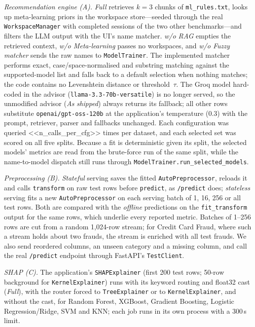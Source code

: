 \emph{Recommendation engine (A).} \emph{Full} retrieves $k{=}3$ chunks of \texttt{ml\_rules.txt}, looks up meta-learning priors in the workspace store---seeded through the real \texttt{WorkspaceManager} with completed sessions of the two other benchmarks---and filters the LLM output with the UI's name matcher. \emph{w/o RAG} empties the retrieved context, \emph{w/o Meta-learning} passes no workspaces, and \emph{w/o Fuzzy matcher} sends the raw names to \texttt{ModelTrainer}. The implemented matcher performs exact, case/space-normalised and substring matching against the supported-model list and falls back to a default selection when nothing matches; the code contains no Levenshtein distance or threshold~$\tau$. The Groq model hard-coded in the advisor (\texttt{llama-3.3-\allowbreak 70b-versatile}) is no longer served, so the unmodified advisor (\emph{As shipped}) always returns its fallback; all other rows substitute \texttt{openai/\allowbreak gpt-oss-120b} at the application's temperature (0.3) with the prompt, retriever, parser and fallbacks unchanged. Each configuration was queried <<n_calls_per_cfg>> times per dataset, and each selected set was scored on all five splits. Because a fit is deterministic given its split, the selected models' metrics are read from the brute-force run of the same split, while the name-to-model dispatch still runs through \texttt{ModelTrainer.\allowbreak run\_selected\_models}.

\emph{Preprocessing (B).} \emph{Stateful} serving saves the fitted \texttt{AutoPreprocessor}, reloads it and calls \texttt{transform} on raw test rows before \texttt{predict}, as \texttt{/predict} does; \emph{stateless} serving fits a new \texttt{AutoPreprocessor} on each serving batch of 1, 16, 256 or all test rows. Both are compared with the \emph{offline} predictions on the \texttt{fit\_transform} output for the same rows, which underlie every reported metric. Batches of 1--256 rows are cut from a random 1{,}024-row stream; for Credit Card Fraud, where such a stream holds about two frauds, the stream is enriched with all test frauds. We also send reordered columns, an unseen category and a missing column, and call the real \texttt{/predict} endpoint through FastAPI's \texttt{TestClient}.

\emph{SHAP (C).} The application's \texttt{SHAPExplainer} (first 200 test rows; 50-row background for \texttt{KernelExplainer}) runs with its keyword routing and float32 cast (\emph{Full}), with the router forced to \texttt{TreeExplainer} or to \texttt{KernelExplainer}, and without the cast, for Random Forest, XGBoost, Gradient Boosting, Logistic Regression/Ridge, SVM and KNN; each job runs in its own process with a 300\,s limit.

